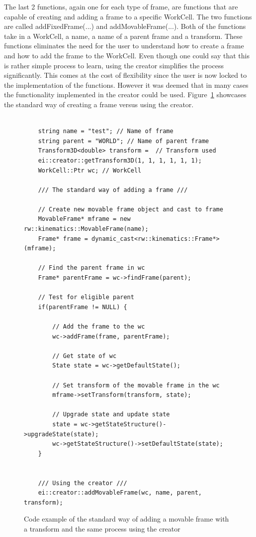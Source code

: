 The last 2 functions, again one for each type of frame, are functions that are capable of creating and adding a frame to a specific WorkCell. The two functions are called addFixedFrame(...) and addMovableFrame(...). Both of the functions take in a WorkCell, a name, a name of a parent frame and a transform. These functions eliminates the need for the user to understand how to create a frame and how to add the frame to the WorkCell. Even though one could say that this is rather simple process to learn, using the creator simplifies the process significantly. This comes at the cost of flexibility since the user is now locked to the implementation of the functions. However it was deemed that in many cases the functionality implemented in the creator could be used. Figure~\ref{fig:CodeExampleAddFrameDifference} showcases the standard way of creating a frame versus using the creator.

\begin{figure}[h]
	\centering
	\lstset{language=C++} 
	\begin{lstlisting}[frame=single]

	string name = "test"; // Name of frame
	string parent = "WORLD"; // Name of parent frame
	Transform3D<double> transform =  // Transform used
	ei::creator::getTransform3D(1, 1, 1, 1, 1, 1);
	WorkCell::Ptr wc; // WorkCell

	/// The standard way of adding a frame ///
	
	// Create new movable frame object and cast to frame
	MovableFrame* mframe = new rw::kinematics::MovableFrame(name);
    Frame* frame = dynamic_cast<rw::kinematics::Frame*>(mframe);
    
    // Find the parent frame in wc
    Frame* parentFrame = wc->findFrame(parent);
	
	// Test for eligible parent
	if(parentFrame != NULL) {
	
		// Add the frame to the wc
        wc->addFrame(frame, parentFrame);
		
		// Get state of wc
		State state = wc->getDefaultState();
		
		// Set transform of the movable frame in the wc
		mframe->setTransform(transform, state);
		
		// Upgrade state and update state
		state = wc->getStateStructure()->upgradeState(state); 
		wc->getStateStructure()->setDefaultState(state); 
    }
	
	
	/// Using the creator ///
	ei::creator::addMovableFrame(wc, name, parent, transform);

	\end{lstlisting}
	\caption{Code example of the standard way of adding a movable frame with a transform and the same process using the creator}
	\label{fig:CodeExampleAddFrameDifference}
\end{figure}

